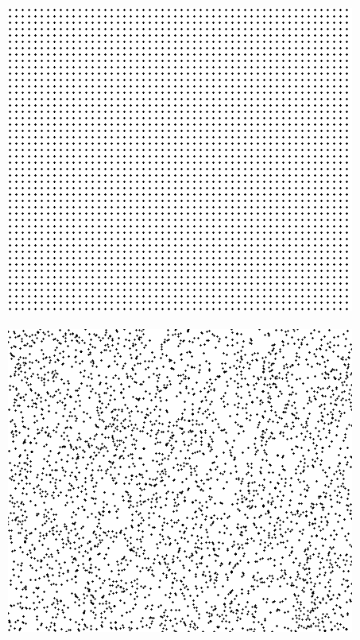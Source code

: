\documentclass[preprint,10pt,5p,times,twocolumn]{elsarticle}
\begin{document}
\begin{figure}[t]
\begin{subfigure}[t]{0.32\linewidth}
\includegraphics[width=\linewidth]{mask_grid.png}
\end{subfigure}
\begin{subfigure}[t]{0.32\linewidth}
\includegraphics[width=\linewidth]{mask_random.png}
\end{subfigure}
\begin{subfigure}[t]{0.32\linewidth}

\end{subfigure}
\end{figure}
\end{document}
